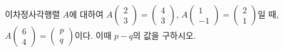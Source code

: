 \hspace*{2mm}\begin{minipage}[t]{\dimexpr\linewidth-2mm\relax}\vspace{0pt}
이차정사각행렬 $A$에 대하여 $A\begin{pmatrix} 2 \\ 3 \end{pmatrix}=\begin{pmatrix} 4 \\ 3 \end{pmatrix}$, $A\begin{pmatrix} 1 \\ -1 \end{pmatrix}=\begin{pmatrix} 2 \\ 1 \end{pmatrix}$일 때, $A\begin{pmatrix} 6 \\ 4 \end{pmatrix}=\begin{pmatrix} p \\ q \end{pmatrix}$이다. 이때 $p-q$의 값을 구하시오.\end{minipage}
